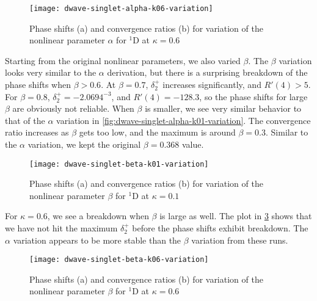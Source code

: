 \documentclass[Dissertation.tex]{subfiles}
\begin{document}
\begin{figure}
	\centering
	\texttt{[image: dwave-singlet-alpha-k06-variation]}
	\caption[Variation of the nonlinear parameter $\alpha$ for $^{1}$D at $\kappa = 0.6$]{Phase shifts (a) and convergence ratios (b) for variation of the nonlinear parameter $\alpha$ for $^{1}$D at $\kappa = 0.6$}
	\label{fig:dwave-singlet-alpha-k06-variation}
\end{figure}

Starting from the original nonlinear parameters, we also varied $\beta$. The
$\beta$ variation looks very similar to the $\alpha$ derivation, but there is
a surprising breakdown of the phase shifts when $\beta > 0.6$. At $\beta = 0.7$,
$\delta_2^+$ increases significantly, and $R'(4) > 5$. For $\beta = 0.8$,
$\delta_2^+ = -2.0694^{-3}$, and $R'(4) = -128.3$, so the phase shifts
for large $\beta$ are obviously not reliable. When $\beta$ is smaller, we see
very similar behavior to that of the $\alpha$ variation in
\cref{fig:dwave-singlet-alpha-k01-variation}. The convergence ratio increases as
$\beta$ gets too low, and the maximum is around $\beta = 0.3$. Similar to the
$\alpha$ variation, we kept the original $\beta = 0.368$ value.

\begin{figure}
	\centering
	\texttt{[image: dwave-singlet-beta-k01-variation]}
	\caption[Variation of the nonlinear parameter $\beta$ for $^{1}$D at $\kappa = 0.1$]{Phase shifts (a) and convergence ratios (b) for variation of the nonlinear parameter $\beta$ for $^{1}$D at $\kappa = 0.1$}
	\label{fig:dwave-singlet-beta-k01-variation}
\end{figure}

For $\kappa = 0.6$, we see a breakdown when $\beta$ is large as well. The plot
in \cref{fig:dwave-singlet-beta-k06-variation} shows that we have not hit the maximum
$\delta_2^+$ before the phase shifts exhibit breakdown. The $\alpha$ variation
appears to be more stable than the $\beta$ variation from these runs.

\begin{figure}
	\centering
	\texttt{[image: dwave-singlet-beta-k06-variation]}
	\caption[Variation of the nonlinear parameter $\beta$ for $^{1}$D at $\kappa = 0.6$]{Phase shifts (a) and convergence ratios (b) for variation of the nonlinear parameter $\beta$ for $^{1}$D at $\kappa = 0.6$}
	\label{fig:dwave-singlet-beta-k06-variation}
\end{figure}
\end{document}
